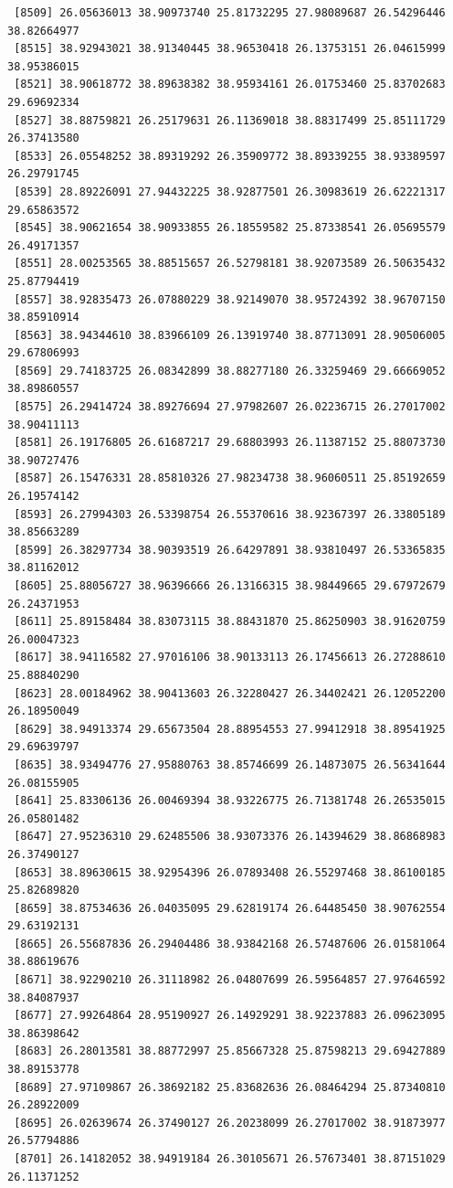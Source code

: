 \documentclass[
  letterpaper,
  DIV=11,
  numbers=noendperiod]{scrartcl}
\begin{document}
\begin{verbatim}
 [8509] 26.05636013 38.90973740 25.81732295 27.98089687 26.54296446 38.82664977
 [8515] 38.92943021 38.91340445 38.96530418 26.13753151 26.04615999 38.95386015
 [8521] 38.90618772 38.89638382 38.95934161 26.01753460 25.83702683 29.69692334
 [8527] 38.88759821 26.25179631 26.11369018 38.88317499 25.85111729 26.37413580
 [8533] 26.05548252 38.89319292 26.35909772 38.89339255 38.93389597 26.29791745
 [8539] 28.89226091 27.94432225 38.92877501 26.30983619 26.62221317 29.65863572
 [8545] 38.90621654 38.90933855 26.18559582 25.87338541 26.05695579 26.49171357
 [8551] 28.00253565 38.88515657 26.52798181 38.92073589 26.50635432 25.87794419
 [8557] 38.92835473 26.07880229 38.92149070 38.95724392 38.96707150 38.85910914
 [8563] 38.94344610 38.83966109 26.13919740 38.87713091 28.90506005 29.67806993
 [8569] 29.74183725 26.08342899 38.88277180 26.33259469 29.66669052 38.89860557
 [8575] 26.29414724 38.89276694 27.97982607 26.02236715 26.27017002 38.90411113
 [8581] 26.19176805 26.61687217 29.68803993 26.11387152 25.88073730 38.90727476
 [8587] 26.15476331 28.85810326 27.98234738 38.96060511 25.85192659 26.19574142
 [8593] 26.27994303 26.53398754 26.55370616 38.92367397 26.33805189 38.85663289
 [8599] 26.38297734 38.90393519 26.64297891 38.93810497 26.53365835 38.81162012
 [8605] 25.88056727 38.96396666 26.13166315 38.98449665 29.67972679 26.24371953
 [8611] 25.89158484 38.83073115 38.88431870 25.86250903 38.91620759 26.00047323
 [8617] 38.94116582 27.97016106 38.90133113 26.17456613 26.27288610 25.88840290
 [8623] 28.00184962 38.90413603 26.32280427 26.34402421 26.12052200 26.18950049
 [8629] 38.94913374 29.65673504 28.88954553 27.99412918 38.89541925 29.69639797
 [8635] 38.93494776 27.95880763 38.85746699 26.14873075 26.56341644 26.08155905
 [8641] 25.83306136 26.00469394 38.93226775 26.71381748 26.26535015 26.05801482
 [8647] 27.95236310 29.62485506 38.93073376 26.14394629 38.86868983 26.37490127
 [8653] 38.89630615 38.92954396 26.07893408 26.55297468 38.86100185 25.82689820
 [8659] 38.87534636 26.04035095 29.62819174 26.64485450 38.90762554 29.63192131
 [8665] 26.55687836 26.29404486 38.93842168 26.57487606 26.01581064 38.88619676
 [8671] 38.92290210 26.31118982 26.04807699 26.59564857 27.97646592 38.84087937
 [8677] 27.99264864 28.95190927 26.14929291 38.92237883 26.09623095 38.86398642
 [8683] 26.28013581 38.88772997 25.85667328 25.87598213 29.69427889 38.89153778
 [8689] 27.97109867 26.38692182 25.83682636 26.08464294 25.87340810 26.28922009
 [8695] 26.02639674 26.37490127 26.20238099 26.27017002 38.91873977 26.57794886
 [8701] 26.14182052 38.94919184 26.30105671 26.57673401 38.87151029 26.11371252

\end{verbatim}
\end{document}
